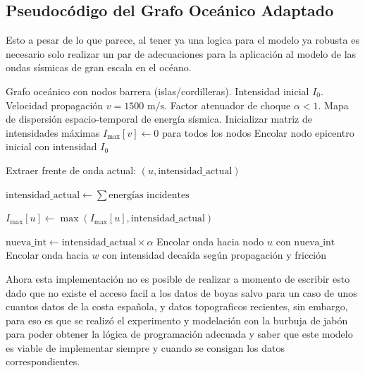 \subsection{Pseudocódigo del Grafo Oceánico Adaptado}

Esto a pesar de lo que parece, al tener ya una logica para el modelo ya robusta es necesario solo realizar un par de adecuaciones para la aplicación al modelo de las ondas sísmicas de gran escala en el océano. 
\begin{algorithm}[H]
\caption{Propagación de onda oceánica con reflexiones e interferencias}
\begin{algorithmic}[1]
\Require Grafo oceánico con nodos barrera (islas/cordilleras). Intensidad inicial $I_0$. Velocidad propagación $v = 1500 \text{ m/s}$. Factor atenuador de choque $\alpha < 1$.
\Ensure Mapa de dispersión espacio-temporal de energía sísmica.
\State Inicializar matriz de intensidades máximas $I_{\text{max}}[v] \gets 0$ para todos los nodos
\State Encolar nodo epicentro inicial con intensidad $I_0$

    \State Extraer frente de onda actual: $(u, \text{intensidad\_actual})$
    
        \State $\text{intensidad\_actual} \gets \sum \text{energías incidentes}$ 
    \EndIf
    
    \State $I_{\text{max}}[u] \gets \max(I_{\text{max}}[u], \text{intensidad\_actual})$ 

            \State $\text{nueva\_int} \gets \text{intensidad\_actual} \times \alpha$ 
            \State Encolar onda hacia nodo $u$ con $\text{nueva\_int}$ 
        \Else
            \State Encolar onda hacia $w$ con intensidad decaída según propagación y fricción
        \EndIf
    \EndFor
\EndWhile
\end{algorithmic}
\label{alg:SimulacionOceano}
\end{algorithm}


Ahora esta implementación no es posible de realizar a momento de escribir esto dado que no existe el acceso facil a los datos de boyas salvo para un caso de unos cuantos datos de la costa española, y datos topograficos recientes, sin embargo, para eso es que se realizó el experimento y modelación con la burbuja de jabón para poder obtener la lógica de programación adecuada y saber que este modelo es viable de implementar siempre y cuando se consigan los datos correspondientes.